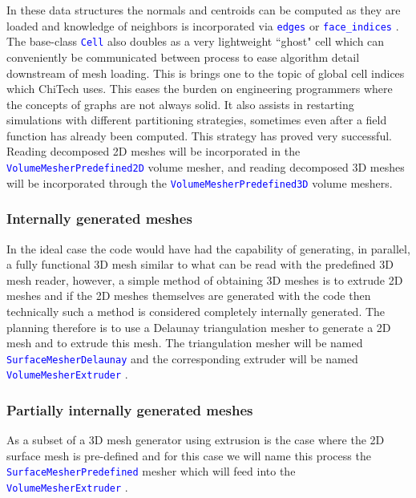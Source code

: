 \documentclass[11pt,letterpaper,titlepage]{article}
\newcommand{\xmltag}[1]{\textcolor{blue}{ \texttt{#1}} }
\numberwithin{equation}{section}
\begin{document}
In these data structures the normals and centroids can be computed as they are loaded and knowledge of neighbors is incorporated via \xmltag{edges} or \xmltag{face\_indices}. The base-class \xmltag{Cell} also doubles as a very lightweight ``ghost" cell which can conveniently be communicated between process to ease algorithm detail downstream of mesh loading. This is brings one to the topic of global cell indices which ChiTech uses. This eases the burden on engineering programmers where the concepts of graphs are not always solid. It also assists in restarting simulations with different partitioning strategies, sometimes even after a field function has already been computed. This strategy has proved very successful.
\newline
\newline
Reading decomposed 2D meshes will be incorporated in the \xmltag{VolumeMesherPredefined2D} volume mesher, and reading decomposed 3D meshes will be incorporated through the \xmltag{VolumeMesherPredefined3D} volume meshers.


\newpage 
\subsubsection{Internally generated meshes}
In the ideal case the code would have had the capability of generating, in parallel, a fully functional 3D mesh similar to what can be read with the predefined 3D mesh reader, however, a simple method of obtaining 3D meshes is to extrude 2D meshes and if the 2D meshes themselves are generated with the code then technically such a method is considered completely internally generated. The planning therefore is to use a Delaunay triangulation mesher to generate a 2D mesh and to extrude this mesh. The triangulation mesher will be named \xmltag{SurfaceMesherDelaunay} and the corresponding extruder will be named \xmltag{VolumeMesherExtruder}.

\subsubsection{Partially internally generated meshes}
As a subset of a 3D mesh generator using extrusion is the case where the 2D surface mesh is pre-defined and for this case we will name this process the \xmltag{SurfaceMesherPredefined} mesher which will feed into the \xmltag{VolumeMesherExtruder}.
\end{document}
